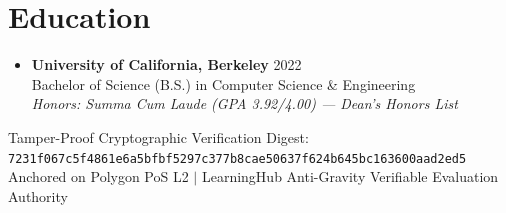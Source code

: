 \documentclass[letterpaper,10pt]{article}
\begin{document}
\section{Education}
\begin{itemize}[leftmargin=0.15in, label={}]
  \item
    \textbf{University of California, Berkeley} \hfill \small{2022} \\
    \small{Bachelor of Science (B.S.) in Computer Science \& Engineering}
    \\ \small{\textit{Honors: Summa Cum Laude (GPA 3.92/4.00) — Dean’s Honors List}}
\end{itemize}

\vfill
\begin{center}
  \footnotesize{\color{gray} Tamper-Proof Cryptographic Verification Digest: \texttt{7231f067c5f4861e6a5bfbf5297c377b8cae50637f624b645bc163600aad2ed5}} \\
  \footnotesize{\color{gray} Anchored on Polygon PoS L2 $|$ LearningHub Anti-Gravity Verifiable Evaluation Authority}
\end{center}
\end{document}
